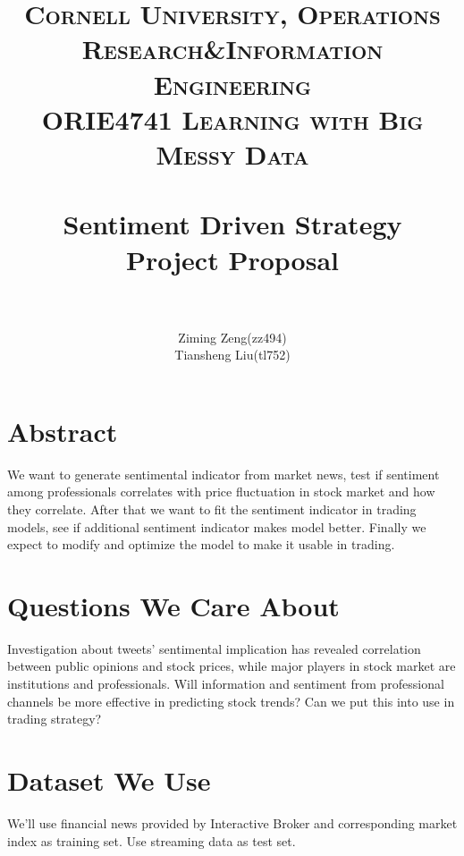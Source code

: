 \documentclass[paper=a4, fontsize=11pt]{scrartcl} %
\title{	
\normalfont \normalsize 
\textsc{\large Cornell University, Operations Research\&Information Engineering\\
ORIE4741 Learning with Big Messy Data} \\ [25pt] %
\horrule{0.5pt} \\[0.4cm] %
\huge Sentiment Driven Strategy \\ %
\normalsize Project Proposal\\
\horrule{1pt} \\[0.5cm] %
}
\author{Ziming Zeng(zz494)\\Tiansheng Liu(tl752)} %
\date{}%
\numberwithin{equation}{section} %
\numberwithin{figure}{section} %
\numberwithin{table}{section} %
\begin{document}
\maketitle %


\section{Abstract}


We want to generate sentimental indicator from market news, test if sentiment among professionals correlates with price fluctuation in stock market and how they correlate. After that we want to fit the sentiment indicator in trading models, see if additional sentiment indicator makes model better. Finally we expect to modify and optimize the model to make it usable in trading.


\section{Questions We Care About}

Investigation about tweets' sentimental implication has revealed correlation between public opinions and stock prices, while major players in stock market are institutions and professionals. Will information and sentiment from professional channels be more effective in predicting stock trends? Can we put this into use in trading strategy?

\section{Dataset We Use}

We'll use financial news provided by Interactive Broker and corresponding market index as training set. Use streaming data as test set.

\end{document}
